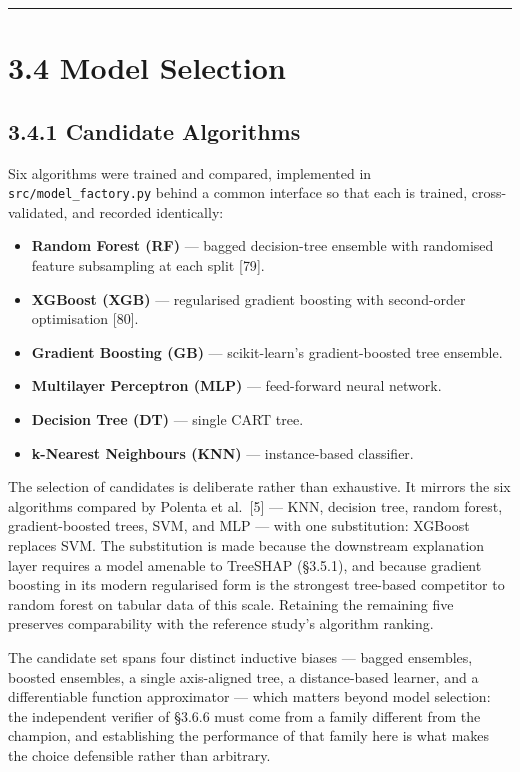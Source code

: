 \begin{center}\rule{0.5\linewidth}{0.5pt}\end{center}

\hypertarget{model-selection}{%
\section{3.4 Model Selection}\label{model-selection}}

\hypertarget{candidate-algorithms}{%
\subsection{3.4.1 Candidate Algorithms}\label{candidate-algorithms}}

Six algorithms were trained and compared, implemented in \texttt{src/model\_factory.py} behind a common interface so that each is trained, cross-validated, and recorded identically:

\begin{itemize}
\tightlist
\item
  \textbf{Random Forest (RF)} --- bagged decision-tree ensemble with randomised feature subsampling at each split {[}79{]}.
\item
  \textbf{XGBoost (XGB)} --- regularised gradient boosting with second-order optimisation {[}80{]}.
\item
  \textbf{Gradient Boosting (GB)} --- scikit-learn's gradient-boosted tree ensemble.
\item
  \textbf{Multilayer Perceptron (MLP)} --- feed-forward neural network.
\item
  \textbf{Decision Tree (DT)} --- single CART tree.
\item
  \textbf{k-Nearest Neighbours (KNN)} --- instance-based classifier.
\end{itemize}

The selection of candidates is deliberate rather than exhaustive. It mirrors the six algorithms compared by Polenta et al.~{[}5{]} --- KNN, decision tree, random forest, gradient-boosted trees, SVM, and MLP --- with one substitution: XGBoost replaces SVM. The substitution is made because the downstream explanation layer requires a model amenable to TreeSHAP (§3.5.1), and because gradient boosting in its modern regularised form is the strongest tree-based competitor to random forest on tabular data of this scale. Retaining the remaining five preserves comparability with the reference study's algorithm ranking.

The candidate set spans four distinct inductive biases --- bagged ensembles, boosted ensembles, a single axis-aligned tree, a distance-based learner, and a differentiable function approximator --- which matters beyond model selection: the independent verifier of §3.6.6 must come from a family different from the champion, and establishing the performance of that family here is what makes the choice defensible rather than arbitrary.

